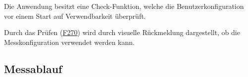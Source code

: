 \documentclass[parskip=full]{scrartcl}
\begin{document}
\begin{description}

\hypertarget{link-f270}{\item[(opt.) F270]} Die Anwendung besitzt eine Check-Funktion, welche die \gls{Benutzerkonfiguration} vor einem Start auf Verwendbarkeit überprüft.
\hypertarget{link-f280}{\item[(opt.) F280]} Durch das Prüfen (\hyperlink{link-f270}{F270}) wird durch visuelle Rückmeldung dargestellt, ob die Messkonfiguration verwendet werden kann.

\end{description}

\subsection{Messablauf}
\end{document}
